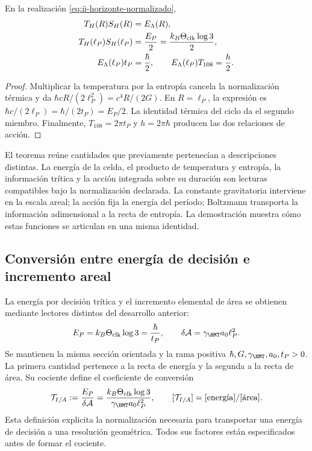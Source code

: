 \begin{theorem}
En la realización \eqref{eq:ii-horizonte-normalizado},
\begin{align}
 T_H(R)S_H(R)&=E_\Lambda(R),\\
 T_H(\ell_P)S_H(\ell_P)&=\frac{E_P}{2}
 =\frac{k_B\Theta_{\rm clk}\log3}{2},\\
 E_\Lambda(\ell_P)t_P&=\frac{\hbar}{2},\qquad
 E_\Lambda(\ell_P)T_{108}=\frac h2.
\end{align}
\end{theorem}
\begin{proof}
Multiplicar la temperatura por la entropía cancela la normalización
térmica y da \(\hbar cR/(2\ell_P^2)=c^4R/(2G)\).
En \(R=\ell_P\), la expresión es \(\hbar c/(2\ell_P)
=\hbar/(2t_P)=E_P/2\). La identidad térmica del ciclo da
el segundo miembro. Finalmente, \(T_{108}=2\pi t_P\) y
\(h=2\pi\hbar\) producen las dos relaciones de acción.
\end{proof}

El teorema reúne cantidades que previamente pertenecían a descripciones
distintas. La energía de la celda, el producto de temperatura y entropía,
la información trítica y la acción integrada sobre su duración son
lecturas compatibles bajo la normalización declarada. La constante
gravitatoria interviene en la escala areal; la acción fija la energía
del período; Boltzmann transporta la información adimensional a la
recta de entropía. La demostración muestra cómo estas funciones se
articulan en una misma identidad.

\subsection{Conversión entre energía de decisión e incremento areal}
\label{sec:ii-conversion-informacion-area}

La energía por decisión trítica y el incremento elemental de área se
obtienen mediante lectores distintos del desarrollo anterior:
\begin{equation}
 E_P=k_B\Theta_{\rm clk}\log3=\frac{\hbar}{t_P},
 \qquad
 \delta\mathcal A=\gamma_{\HMT}a_0\ell_P^2.
 \label{eq:ii-confluencia-cuanto-energia-area}
\end{equation}
Se mantienen la misma sección orientada y la rama positiva
\(\hbar,G,\gamma_{\HMT},a_0,t_P>0\). La primera cantidad
pertenece a la recta de energía y la segunda a la recta de área.
Su cociente define el coeficiente de conversión
\begin{equation}
 \mathcal T_{I/A}
 :=\frac{E_P}{\delta\mathcal A}
 =\frac{k_B\Theta_{\rm clk}\log3}
        {\gamma_{\HMT}a_0\ell_P^2},
 \qquad [\mathcal T_{I/A}]=[\text{energía}]/[\text{área}].
 \label{eq:ii-confluencia-tension}
\end{equation}
Esta definición explicita la normalización necesaria para transportar
una energía de decisión a una resolución geométrica. Todos sus factores
están especificados antes de formar el cociente.

